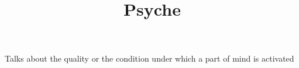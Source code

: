 \documentclass[a4paper]{article}
\title{Psyche}
\date{}
\begin{document}
    \maketitle
    Talks about the quality or the condition under which a part of mind is activated
\end{document}
